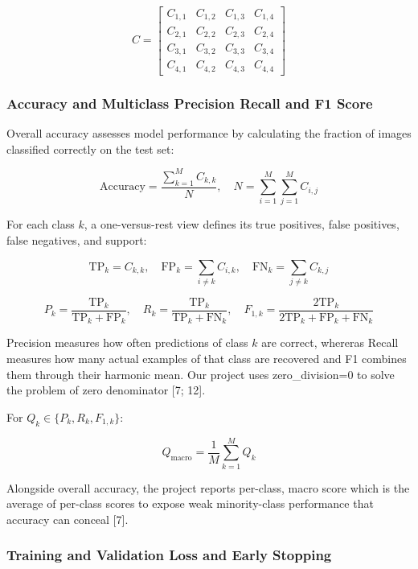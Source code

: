\documentclass[11pt,a4paper]{article}
\begin{document}
\[
C=\left[ \begin{matrix}{C}_{1,1} & {C}_{1,2} & {C}_{1,3} & {C}_{1,4} \\ {C}_{2,1} & {C}_{2,2} & {C}_{2,3} & {C}_{2,4} \\ {C}_{3,1} & {C}_{3,2} & {C}_{3,3} & {C}_{3,4} \\ {C}_{4,1} & {C}_{4,2} & {C}_{4,3} & {C}_{4,4}\end{matrix}\right] 
\]

\subsubsection{Accuracy and Multiclass Precision Recall and F1 Score}\label{theory:2.4.2}

Overall accuracy assesses model performance by calculating the fraction of images classified correctly on the test set:

\[
\mathrm{Accuracy}=\frac{\sum _{k=1}^{M} {C}_{k,k}}{N},\quad N=\sum _{i=1}^{M} \sum _{j=1}^{M} {C}_{i,j}
\]

For each class \(k\), a one-versus-rest view defines its true positives, false positives, false negatives, and support:

\[
{\mathrm{TP}}_{k}={C}_{k,k},\quad {\mathrm{FP}}_{k}=\sum _{i\ne k} {C}_{i,k},\quad {\mathrm{FN}}_{k}=\sum _{j\ne k} {C}_{k,j}
\]

\[
{P}_{k}=\frac{{\mathrm{TP}}_{k}}{{\mathrm{TP}}_{k}+{\mathrm{FP}}_{k}},\quad {R}_{k}=\frac{{\mathrm{TP}}_{k}}{{\mathrm{TP}}_{k}+{\mathrm{FN}}_{k}},\quad {F}_{1,k}=\frac{2{\mathrm{TP}}_{k}}{2{\mathrm{TP}}_{k}+{\mathrm{FP}}_{k}+{\mathrm{FN}}_{k}}
\]

Precision measures how often predictions of class \(k\) are correct, whereras Recall measures how many actual examples of that class are recovered and F1 combines them through their harmonic mean. Our project uses zero\_division=0 to solve the problem of zero denominator [7; 12].

For \({Q}_{k}\in \{{P}_{k},{R}_{k},{F}_{1,k}\}\):

\[
{Q}_{\mathrm{macro}}=\frac{1}{M}\sum _{k=1}^{M} {Q}_{k}
\]

Alongside overall accuracy, the project reports per-class, macro score which is the average of per-class scores to expose weak minority-class performance that accuracy can conceal [7].

\subsubsection{Training and Validation Loss and Early Stopping}\label{theory:2.4.3}
\end{document}
